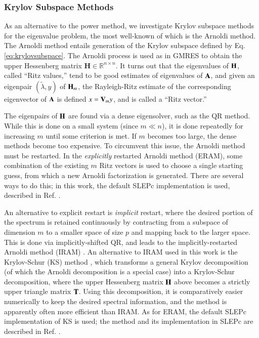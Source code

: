 \subsubsection{Krylov Subspace Methods}

As an alternative to the power method, we investigate Krylov subspace 
methods for the eigenvalue problem, the most well-known of which is 
the Arnoldi method.  The Arnoldi method entails generation
of the Krylov subspace defined by Eq. \ref{eq:krylovsubspace}.
The Arnoldi process is used as in GMRES to obtain the 
upper Hessenberg matrix $\mathbf{H} \in \mathbb{R}^{n \times n}$. It turns 
out that the eigenvalues of $\mathbf{H}$, called ``Ritz values,'' tend to
be good estimates of eigenvalues of $\mathbf{A}$, and given an eigenpair
$(\tilde{\lambda}, y)$ of $\mathbf{H}_m$, the Rayleigh-Ritz estimate of the
corresponding eigenvector of $\mathbf{A}$ is defined $x = \mathbf{V}_m y$, 
and is called a ``Ritz vector.''

The eigenpairs of $\mathbf{H}$ are found via a dense eigensolver, such as 
the QR method.  While this is done on a small system (since $m \ll n$), 
it is done repeatedly for increasing $m$ until some criterion is met.  
If $m$ becomes too large, the dense methods become too expensive.  To 
circumvent this issue, the Arnoldi method must be restarted.  In 
the {\it explicitly} restarted Arnoldi method (ERAM), some combination of 
the existing $m$ Ritz vectors is used to choose a single starting guess, 
from which a new Arnoldi factorization is generated.  There are several ways 
to do this; in this work, the default SLEPc implementation is used, 
described in Ref. \cite{slepc-str-4}.

An alternative to explicit restart is {\it implicit} restart, where the 
desired portion of the spectrum is retained continuously by contracting 
from a subspace of dimension $m$ to a smaller space of size $p$ and mapping 
back to the larger space.  This is done via implicitly-shifted QR, and leads 
to the implicitly-restarted Arnoldi method (IRAM) \cite{sorensen1992iap}.  
An alternative to IRAM used in this work is the Krylov-Schur (KS) method
\cite{stewart2002ksa}, which transforms a general Krylov decomposition 
(of which the Arnoldi decomposition is a special case) into a Krylov-Schur 
decomposition,
where the upper Hessenberg matrix $\mathbf{H}$ above becomes a strictly upper
triangle matrix $\mathbf{T}$.  Using this decomposition, it is comparatively
easier numerically to keep the desired spectral information, and the 
method is apparently often more efficient than IRAM.  As for ERAM, the 
default SLEPc implementation of KS is used; the method and its 
implementation in SLEPc are
described in Ref. \cite{slepc-str-7}.

